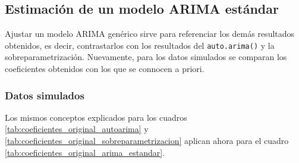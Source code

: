 \documentclass[
]{article}
\begin{document}
\subsection{Estimación de un modelo ARIMA estándar}

Ajustar un modelo ARIMA genérico sirve para referenciar los demás
resultados obtenidos, es decir, contrastarlos con los resultados del
\texttt{auto.arima()} y la sobreparametrización. Nuevamente, para los
datos simulados se comparan los coeficientes obtenidos con los que se
connocen a priori.

\subsubsection{Datos simulados}

Los mismos conceptos explicados para los cuadros
\ref{tab:coeficientes_original_autoarima} y
\ref{tab:coeficientes_original_sobreparametrizacion} aplican ahora para
el cuadro \ref{tab:coeficientes_original_arima_estandar}.
\end{document}
